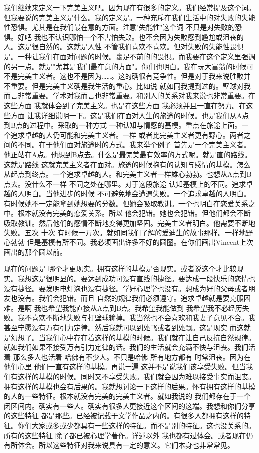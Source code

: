我们继续来定义一下完美主义吧。因为现在有很多的定义。我们经常提及这个词。但我要说的完美主义是什么。我的定义是。一种充斥在我们生活中的对失败的失能性恐惧。尤其是在我们最在意的方面。注意"失能性"这个词 不只是对失败的恐惧。好吧 我也不认识哪怕一个不害怕失败。也不会因为失败感到尴尬或沮丧的人。这是很自然的。这就是人性 不管我们喜欢不喜欢。但对失败的失能性畏惧是。一种让我们在面对问题的时候。裹足不前的的畏惧。而我要在这个定义里强调的另一点。就是"尤其是我们最在意的方面"。你们也明白。我在玩大富翁的时候可不是完美主义者。这也不是因为……。这的确很有竞争性。但是对于我来说胜败并不重要。但是完美主义确是我生活的重心。比如说 就如同我提到过的。壁球对我而言非常重要。学术对我而言也非常重要。和别人的关系对我来说也非常重要。在这些方面 我就体会到了完美主义。也是在这些方面 我必须并且一直在努力。在这些方面 让我详细说明一下。这是我们在面对人生的旅途的时候。也是我们从A点到B点的过程中。采取的一种方式 一种认知与情感的基模。重点在旅途上面。一个追求卓越的人仍可能和完美主义者。一样 或者比完美主义者更有野心。两者之间的不同。在于他们面对旅途时的方式。我来举个例子 首先是一个完美主义者。他正站在A点。他想到B点去。什么是最完美最有效率的方式呢。就是直的路线。这就是路线 这就完美主义者在面对。旅途的时候抱有的认知与感情的基模。怎么从起点到终点。一个追求卓越的人。和完美主义者一样雄心勃勃。也想从A点到B点去。没什么不一样 不同之处在哪里。对于这段旅途 认知基模上的不同。追求卓越的人明白。当他进步的时候 不可避免地会遭遇失败。一个追求卓越的人明白。有时候她不一定能拿到她想要的分数。但她会吸取教训。一个也明白在恋爱关系之中。根本就没有完美的恋爱关系。所以 他会犯错。她也会犯错。但他们都会不断吸取教训。然后他们的感情不断地变得更加坚固。完美主义者明白。他需要不断地失败。五次 十次 有时候一万次。就如同我们了解的爱迪生的故事那样。一样地野心勃勃 但是基模有所不同。我必须画出许多不好的圆圈。在你们画出Vincent上次画出的那个圆以前。 

现在的问题是 哪个才更现实。拥有这样的基模是否现实。或者说这个才比较现实。我想这是很明显的。要达到成功可没有直线的捷径。要达成一段快乐的恋情也没有捷径。要发明电灯泡也没有捷径。学好心理学也没有。想成为好的父母或者朋友也没有。我们会犯错。而且 自然的规律我们必须遵守。追求卓越就是要克服困难。是啊 我也希望我能直接从A点到B点。我希望我能做到 我希望我不必经历失败。我不喜欢不断地失败与打壁球输掉。我当然也不会喜欢和我妻子意见不合。我甚至宁愿没有万有引力定律。然后我就可以到处飞或者到处飘。这是现实 而这就是幻想了。当我们心中存在着这样的基模的时候。我们就在让自己反抗自然规律。就如我们如果不接受万有引力定律的话。我们的生活就会充满不快与沮丧。我们活着 那么多人也活着 哈佛有不少人。不只是哈佛 所有地方都有 时常沮丧。因为在他们心里 他们一直有这样的基模。再说一遍 这并不是说我们该享受失败。但当我们有这样的基模的时候。同时又不享受失败。我们就会因为难以接受事实而沮丧。拥有这样的基模也会有后果的。我就想讨论一下这样的后果。怀有拥有这样的基模的人的一些特征。根本就没有完美的完美主义者。就如我说的 我们都存在于一个闭区间内。确实有一些人。确实有很多人更接近这个区间的这端。我想和你们分享的这些特征 都是那些。已经被记载于文学作品之内的。有很多人都拥有这样的特征。你们大家或多或少都具有一些这样的特征。而不是别的特征。这也没关系的。所有的这些特征 除了都已被心理学著作。详述以外 我也都有过体会。或者现在仍有所体会。所以这些特征对我来说具有一定的意义。它们本身也非常常见。 

